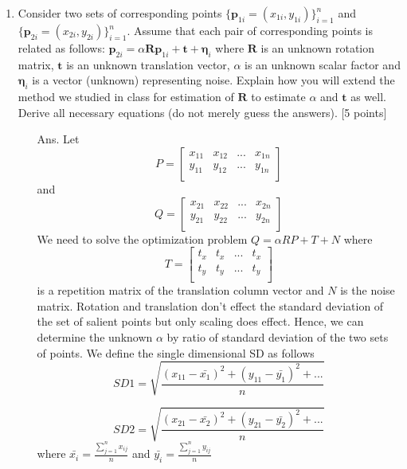 \documentclass[11pt]{article}
\begin{document}
\begin{enumerate}
\item Consider two sets of corresponding points $\{\mathbf{p}_{1i} = (x_{1i},y_{1i})\}_{i=1}^{n}$ and $\{\mathbf{p}_{2i} = (x_{2i},y_{2i})\}_{i=1}^{n}$. Assume that each pair of corresponding points is related as follows: $\mathbf{p}_{2i} = \alpha \mathbf{R} \mathbf{p}_{1i} + \mathbf{t} + \mathbf{\eta}_i$ where $\mathbf{R}$ is an unknown rotation matrix, $\mathbf{t}$ is an unknown translation vector, $\alpha$ is an unknown scalar factor and $\mathbf{\eta}_i$ is a vector (unknown) representing noise. Explain how you will extend the method we studied in class for estimation of $\mathbf{R}$ to estimate $\alpha$ and $\mathbf{t}$ as well. Derive all necessary equations (do not merely guess the answers). \textsf{[5 points]}
\begin{itemize}
\item[Ans.] Let \[ P=
		\begin{bmatrix}
		x_{11} & x_{12} & ... & x_{1n}\\
		y_{11} & y_{12} & ... & y_{1n}\\	
		\end{bmatrix}		  
		\]	
		and
		\[ Q=
		\begin{bmatrix}
		x_{21} & x_{22} & ... & x_{2n}\\
		y_{21} & y_{22} & ... & y_{2n}\\	
		\end{bmatrix}		  
		\]
		We need to solve the optimization problem $Q=\alpha RP+T+N$ where \[ T=
		\begin{bmatrix}
		t_x & t_x & ... & t_x\\
		t_y & t_y & ... & t_y\\	
		\end{bmatrix}		  
		\] 
		is a repetition matrix of the translation column vector and $N$ is the noise matrix.\newline
Rotation and translation don't effect the standard deviation of the set of salient points but only scaling does effect. Hence, we can determine the unknown $\alpha$ by ratio of standard deviation of the two sets of points. We define the single dimensional SD as follows
\begin{equation}
SD1=\sqrt{\frac{(x_{11}-\bar{x_1})^2+(y_{11}-\bar{y_1})^2+...}{n}}
\end{equation}    
	
\begin{equation}
SD2=\sqrt{\frac{(x_{21}-\bar{x_2})^2+(y_{21}-\bar{y_2})^2+...}{n}}
\end{equation}		
where $\bar{x_i}=\frac{\sum\limits_{j=1}^n x_{ij}}{n}$ and $\bar{y_i}=\frac{\sum\limits_{j=1}^n y_{ij}}{n}$ 


\end{itemize}
\end{enumerate}
\end{document}
